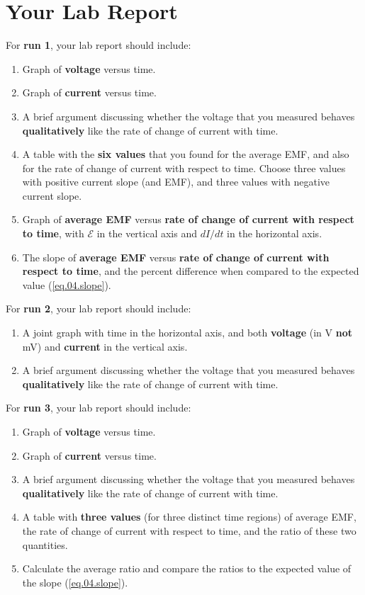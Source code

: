 \section{Your Lab Report}
For \textbf{run 1}, your lab report should include:
\begin{enumerate}
	\item Graph of \textbf{voltage} versus time.
	\item Graph of \textbf{current} versus time.
	\item A brief argument discussing whether the voltage that you measured behaves \textbf{qualitatively} like the rate of change of current with time.
	\item A table with the \textbf{six values} that you found for the average EMF, and also for the rate of change of current with respect to time. Choose three values with positive current slope (and EMF), and three values with negative current slope.
	\item Graph of \textbf{average EMF} versus \textbf{rate of change of current with respect to time}, with $\mathcal{E}$ in the vertical axis and $dI/dt$ in the horizontal axis.
	\item The slope of \textbf{average EMF} versus \textbf{rate of change of current with respect to time}, and the percent difference when compared to the expected value (\ref{eq.04.slope}).
\end{enumerate}
For \textbf{run 2}, your lab report should include:
\begin{enumerate}
	\item A joint graph with time in the horizontal axis, and both \textbf{voltage} (in V \textbf{not} mV) and \textbf{current} in the vertical axis.
	\item A brief argument discussing whether the voltage that you measured behaves \textbf{qualitatively} like the rate of change of current with time.
\end{enumerate}
For \textbf{run 3}, your lab report should include:
\begin{enumerate}
	\item Graph of \textbf{voltage} versus time.
	\item Graph of \textbf{current} versus time.
	\item A brief argument discussing whether the voltage that you measured behaves \textbf{qualitatively} like the rate of change of current with time.
	\item A table with \textbf{three values} (for three distinct time regions) of average EMF, the rate of change of current with respect to time, and the ratio of these two quantities.
	\item Calculate the average ratio and compare the ratios to the expected value of the slope (\ref{eq.04.slope}).
\end{enumerate}
